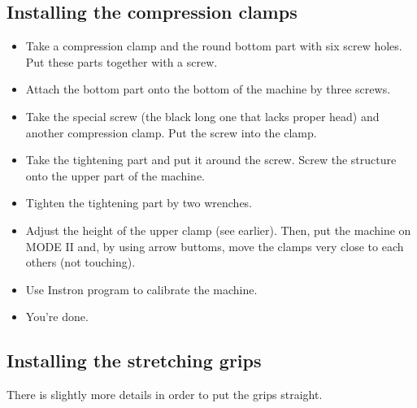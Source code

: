 \documentclass[a4paper]{article}
\begin{document}
\subsection{Installing the compression clamps}

\begin{itemize}
  \item Take a compression clamp and the round bottom part with six screw holes. Put these parts together with a screw.
  \item Attach the bottom part onto the bottom of the machine by three screws.
  \item Take the special screw (the black long one that lacks proper head) and another compression clamp. Put the screw into the clamp.
  \item Take the tightening part and put it around the screw. Screw the structure onto the upper part of the machine.
  \item Tighten the tightening part by two wrenches.
  \item Adjust the height of the upper clamp (see earlier). Then, put the machine on \textsf{MODE II} and, by using arrow buttoms, move the clamps very close to each others (not touching).
  \item Use Instron program to calibrate the machine.
  \item You're done.
\end{itemize}

\subsection{Installing the stretching grips}

There is slightly more details in order to put the grips straight.
\end{document}
